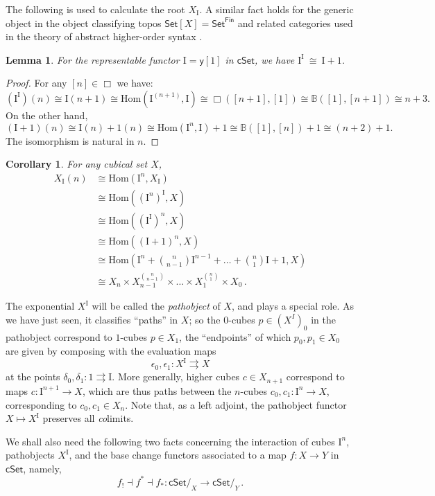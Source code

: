 \documentclass[11pt,reqno]{amsart}
\newcommand{\B}{\ensuremath{\mathbb{B}}}
\newcommand{\Set}{\ensuremath{\mathsf{Set}}}
\newcommand{\cSet}{\ensuremath{\mathsf{cSet}}}
\newcommand{\y}{\ensuremath{\mathsf{y}}} %
\renewcommand{\to}{\ensuremath{\rightarrow}}
\newcommand{\too}{\ensuremath{\longrightarrow}}
\newcommand{\Hom}{\ensuremath{\mathrm{Hom}}}
\renewcommand{\hom}{\ensuremath{\mathrm{Hom}}}
\newcommand{\I}{\ensuremath{\mathrm{I}}}
\renewcommand{\H}{\ensuremath{\Box}}
\newtheorem{lemma}[theorem]{Lemma}
\newtheorem{corollary}[theorem]{Corollary}
\theoremstyle{remark}
\theoremstyle{definition}
\begin{document}
The following is used to calculate the root $X_\I$. A similar fact holds for the generic object in the object classifying topos $\Set[X]=\Set^{\mathsf{Fin}}$ and related categories used in the theory of abstract higher-order syntax \cite{FiorePlotkinTuri:1999}.

\begin{lemma}\label{lemma:binomial}
For the representable functor $\I = \y[1]$ in $\cSet$, we have $\I^\I\ \cong\ \I+1$.
\end{lemma}
\begin{proof}
For any $[n] \in \H$ we have:
\[
(\I^\I)(n) \cong \I(n+1) \cong \Hom(\I^{(n+1)},\I)\cong \H([n+1],[1])\cong \B([1], [n+1])\cong n+3.
\]
On the other hand,
\[
(\I+1)(n) \cong \I(n) + 1(n) \cong \Hom(\I^n, \I) + 1 \cong \B([1],[n]) +1 \cong (n+2) +1.
\]
The isomorphism is natural in $n$.
\end{proof}

\begin{corollary} For any cubical set $X$,
\begin{align*}\textstyle
X_\I(n) &\cong \hom(\I^n, X_\I) \\
&\cong \hom((\I^n)^\I, X) \\
&\cong \hom((\I^\I)^n, X) \\
&\cong \hom((\I+1)^n, X) \\
&\cong \hom(\I^n +  {\textstyle{n\choose n-1}}\I^{n-1} + \dots + {\textstyle{n\choose 1}}\I+1, X) \\
&\cong X_n \times X_{n-1}^{\binom{n}{n-1}} \times \dots \times X_1^{\binom{n}{1}}\times X_0\,.
\end{align*}
\end{corollary}

The exponential  $X^\I$ will be called the \emph{pathobject} of $X$, and plays a special role.  As we have just seen, it classifies ``paths'' in $X$; so the $0$-cubes $p \in (X^I)_0$ in the pathobject correspond to $1$-cubes $p\in X_1$, the ``endpoints'' of which $p_0, p_1\in X_0$ are given by composing with the evaluation maps 
\[
\epsilon_0, \epsilon_1 : X^\I \rightrightarrows X
\]
at the points $\delta_0, \delta_1 : 1\rightrightarrows \I$. More generally, higher cubes $c\in X_{n+1}$ correspond to maps $c : \I^{n+1}\to X$, which are thus paths between the $n$-cubes $c_0, c_1 : \I^n \to X$, corresponding to $c_0, c_1 \in X_n$.  
Note that, as a left adjoint, the pathobject functor $X\mapsto X^\I$ preserves all \emph{co}limits.   

We shall also need the following two facts concerning the interaction of cubes $\I^n$, pathobjects $X^\I$, and the base change functors associated to a map $f : X\to Y$  in $\cSet$, namely,
\[
f_!\dashv f^* \dashv f_* : \cSet/_X \too \cSet/_Y\,.
\]
\end{document}
